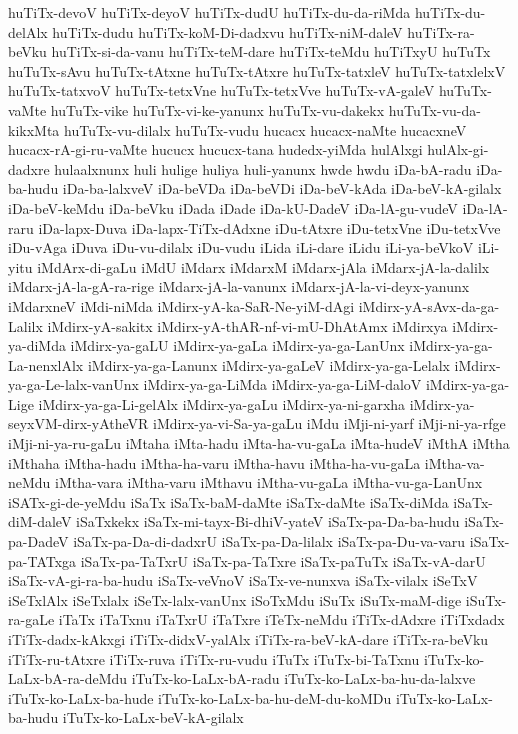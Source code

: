 {huTiTx-devoV
huTiTx-deyoV
huTiTx-dudU
huTiTx-du-da-riMda
huTiTx-du-delAlx
huTiTx-dudu
huTiTx-koM-Di-dadxvu
huTiTx-niM-daleV
huTiTx-ra-beVku
huTiTx-si-da-vanu
huTiTx-teM-dare
huTiTx-teMdu
huTiTxyU
huTuTx
huTuTx-sAvu
huTuTx-tAtxne
huTuTx-tAtxre
huTuTx-tatxleV
huTuTx-tatxlelxV
huTuTx-tatxvoV
huTuTx-tetxVne
huTuTx-tetxVve
huTuTx-vA-galeV
huTuTx-vaMte
huTuTx-vike
huTuTx-vi-ke-yanunx
huTuTx-vu-dakekx
huTuTx-vu-da-kikxMta
huTuTx-vu-dilalx
huTuTx-vudu
hucacx
hucacx-naMte
hucacxneV
hucacx-rA-gi-ru-vaMte
hucucx
hucucx-tana
hudedx-yiMda
hulAlxgi
hulAlx-gi-dadxre
hulaalxnunx
huli
hulige
huliya
huli-yanunx
hwde
hwdu
iDa-bA-radu
iDa-ba-hudu
iDa-ba-lalxveV
iDa-beVDa
iDa-beVDi
iDa-beV-kAda
iDa-beV-kA-gilalx
iDa-beV-keMdu
iDa-beVku
iDada
iDade
iDa-kU-DadeV
iDa-lA-gu-vudeV
iDa-lA-raru
iDa-lapx-Duva
iDa-lapx-TiTx-dAdxne
iDu-tAtxre
iDu-tetxVne
iDu-tetxVve
iDu-vAga
iDuva
iDu-vu-dilalx
iDu-vudu
iLida
iLi-dare
iLidu
iLi-ya-beVkoV
iLi-yitu
iMdArx-di-gaLu
iMdU
iMdarx
iMdarxM
iMdarx-jAla
iMdarx-jA-la-dalilx
iMdarx-jA-la-gA-ra-rige
iMdarx-jA-la-vanunx
iMdarx-jA-la-vi-deyx-yanunx
iMdarxneV
iMdi-niMda
iMdirx-yA-ka-SaR-Ne-yiM-dAgi
iMdirx-yA-sAvx-da-ga-Lalilx
iMdirx-yA-sakitx
iMdirx-yA-thAR-nf-vi-mU-DhAtAmx
iMdirxya
iMdirx-ya-diMda
iMdirx-ya-gaLU
iMdirx-ya-gaLa
iMdirx-ya-ga-LanUnx
iMdirx-ya-ga-La-nenxlAlx
iMdirx-ya-ga-Lanunx
iMdirx-ya-gaLeV
iMdirx-ya-ga-Lelalx
iMdirx-ya-ga-Le-lalx-vanUnx
iMdirx-ya-ga-LiMda
iMdirx-ya-ga-LiM-daloV
iMdirx-ya-ga-Lige
iMdirx-ya-ga-Li-gelAlx
iMdirx-ya-gaLu
iMdirx-ya-ni-garxha
iMdirx-ya-seyxVM-dirx-yAtheVR
iMdirx-ya-vi-Sa-ya-gaLu
iMdu
iMji-ni-yarf
iMji-ni-ya-rfge
iMji-ni-ya-ru-gaLu
iMtaha
iMta-hadu
iMta-ha-vu-gaLa
iMta-hudeV
iMthA
iMtha
iMthaha
iMtha-hadu
iMtha-ha-varu
iMtha-havu
iMtha-ha-vu-gaLa
iMtha-va-neMdu
iMtha-vara
iMtha-varu
iMthavu
iMtha-vu-gaLa
iMtha-vu-ga-LanUnx
iSATx-gi-de-yeMdu
iSaTx
iSaTx-baM-daMte
iSaTx-daMte
iSaTx-diMda
iSaTx-diM-daleV
iSaTxkekx
iSaTx-mi-tayx-Bi-dhiV-yateV
iSaTx-pa-Da-ba-hudu
iSaTx-pa-DadeV
iSaTx-pa-Da-di-dadxrU
iSaTx-pa-Da-lilalx
iSaTx-pa-Du-va-varu
iSaTx-pa-TATxga
iSaTx-pa-TaTxrU
iSaTx-pa-TaTxre
iSaTx-paTuTx
iSaTx-vA-darU
iSaTx-vA-gi-ra-ba-hudu
iSaTx-veVnoV
iSaTx-ve-nunxva
iSaTx-vilalx
iSeTxV
iSeTxlAlx
iSeTxlalx
iSeTx-lalx-vanUnx
iSoTxMdu
iSuTx
iSuTx-maM-dige
iSuTx-ra-gaLe
iTaTx
iTaTxnu
iTaTxrU
iTaTxre
iTeTx-neMdu
iTiTx-dAdxre
iTiTxdadx
iTiTx-dadx-kAkxgi
iTiTx-didxV-yalAlx
iTiTx-ra-beV-kA-dare
iTiTx-ra-beVku
iTiTx-ru-tAtxre
iTiTx-ruva
iTiTx-ru-vudu
iTuTx
iTuTx-bi-TaTxnu
iTuTx-ko-LaLx-bA-ra-deMdu
iTuTx-ko-LaLx-bA-radu
iTuTx-ko-LaLx-ba-hu-da-lalxve
iTuTx-ko-LaLx-ba-hude
iTuTx-ko-LaLx-ba-hu-deM-du-koMDu
iTuTx-ko-LaLx-ba-hudu
iTuTx-ko-LaLx-beV-kA-gilalx
}
